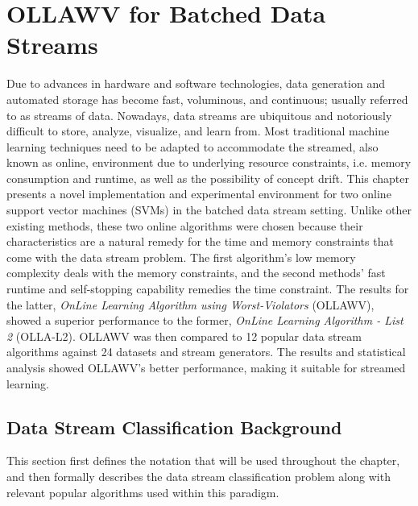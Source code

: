 \documentclass[reqno]{vcuthesis}
\numberwithin{equation}{chapter}
\begin{document}
\chapter{OLLAWV for Batched Data Streams}
Due to advances in hardware and software technologies, data generation and automated storage has become fast, voluminous, and continuous; usually referred to as streams of data. Nowadays, data streams are ubiquitous and notoriously difficult to store, analyze, visualize, and learn from. Most traditional machine learning techniques need to be adapted to accommodate the streamed, also known as online, environment due to underlying resource constraints, i.e. memory consumption and runtime, as well as the possibility of concept drift. This chapter presents a novel implementation and experimental environment for two online support vector machines (SVMs) in the batched data stream setting. Unlike other existing methods, these two online algorithms were chosen because their characteristics are a natural remedy for the time and memory constraints that come with the data stream problem. The first algorithm's low memory complexity deals with the memory constraints, and the second methods' fast runtime and self-stopping capability remedies the time constraint. The results for the latter, \textit{OnLine Learning Algorithm using Worst-Violators} (OLLAWV), showed a superior performance to the former, \textit{OnLine Learning Algorithm - List 2} (OLLA-L2). OLLAWV was then compared to 12 popular data stream algorithms against 24 datasets and stream generators. The results and statistical analysis showed OLLAWV's better performance, making it suitable for streamed learning. 

\section{Data Stream Classification Background}
This section first defines the notation that will be used throughout the chapter, and then formally describes the data stream classification problem along with relevant popular algorithms used within this paradigm.
\end{document}
